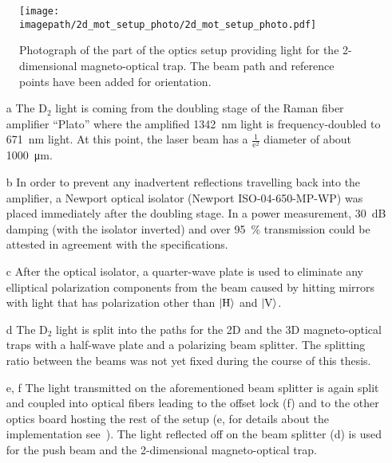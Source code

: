 \begin{figure}
    \centering
    \texttt{[image: \\imagepath/2d\_mot\_setup\_photo/2d\_mot\_setup\_photo.pdf]}
    \caption{Photograph of the part of the optics setup providing light for the 2-dimensional magneto-optical trap. The beam path and reference points have been added for orientation.}\label{fig:2d_mot_setup_photo}
\end{figure}

\begin{itemize}
    \item[a] The D$_2$ light is coming from the doubling stage of the Raman fiber amplifier ``Plato'' where the amplified \SI{1342}{\nano\meter} light is frequency-doubled to \SI{671}{\nano\meter} light. At this point, the laser beam has a $\frac{1}{\text{e}^2}$ diameter of about \SI{1000}{\micro\meter}.

    \item[b] In order to prevent any inadvertent reflections travelling back into the amplifier, a Newport optical isolator (Newport ISO-04-650-MP-WP) was placed immediately after the doubling stage. In a power measurement, \SI{30}{\deci\bel} damping (with the isolator inverted) and over \SI{95}{\percent} transmission could be attested in agreement with the specifications.

    \item[c] After the optical isolator, a quarter-wave plate is used to eliminate any elliptical polarization components from the beam caused by hitting mirrors with light that has polarization other than $\Ket{\text{H}}$ and $\Ket{\text{V}}$.

    \item[d] The D$_2$ light is split into the paths for the 2D and the 3D magneto-optical traps with a half-wave plate and a polarizing beam splitter. The splitting ratio between the beams was not yet fixed during the course of this thesis.

    \item[e, f] The light transmitted on the aforementioned beam splitter is again split and coupled into optical fibers leading to the offset lock (f) and to the other optics board hosting the rest of the setup (e, for details about the implementation see~\cite{qesja_design_2022}). The light reflected off on the beam splitter (d) is used for the push beam and the 2-dimensional magneto-optical trap.


\end{itemize}
